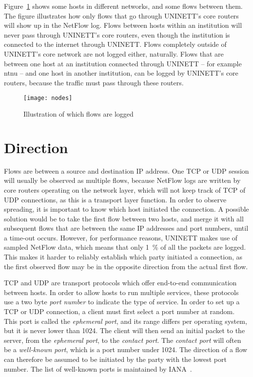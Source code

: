 Figure~\ref{fig:nodes} shows some hosts in different networks, and some flows between them.
The figure illustrates how only flows that go through UNINETT's core routers will show up in the NetFlow log.
Flows between hosts within an institution will never pass through UNINETT's core routers, even though the institution is connected to the internet through UNINETT.
Flows completely outside of UNINETT's core network are not logged either, naturally.
Flows that are between one host at an institution connected through UNINETT -- for example \gls{ntnu} -- and one host in another institution, can be logged by UNINETT's core routers, because the traffic must pass through these routers.

\begin{figure}[h]
	\caption{Illustration of which flows are logged}
	\label{fig:nodes}
	\centering
		\texttt{[image: nodes]}
\end{figure}


\section{Direction}
\label{sec:direction}

Flows are between a source and destination IP address.
One TCP or UDP session will usually be observed as multiple flows,
because NetFlow logs are written by core routers operating on the \gls{network layer},
 which will not keep track of TCP of UDP connections, as this is a \gls{transport layer} function.
In order to observe spreading, it is important to know which host initiated the connection.
A possible solution would be to take the first flow between two hosts, and merge it with all subsequent flows that are between the same IP addresses and port numbers,
 until a time-out occurs.
However, for performance reasons, UNINETT makes use of sampled NetFlow data, which means that only 1~\% of all the packets are logged.
This makes it harder to reliably establish which party initiated a connection,
 as the first observed flow may be in the opposite direction from the actual first flow.

TCP and UDP are transport protocols which offer end-to-end communication between hosts.
In order to allow hosts to run multiple services, these protocols use a two byte \emph{port number} to indicate the type of service.
In order to set up a TCP or UDP connection, a client must first select a port number at random.
This port is called the \emph{\gls{ephemeral port}}, and its range differs per operating system, but it is never lower than 1024.
The client will then send an initial packet to the server, from the \emph{\gls{ephemeral port}}, to the \emph{\gls{contact port}}.
The \emph{\gls{contact port}} will often be a \emph{\gls{well-known port}}, which is a port number under 1024.
The direction of a flow can therefore be assumed to be initiated by the party with the lowest port number.
The list of \gls{well-known port}s is maintained by IANA~\cite{rfc1700}.


